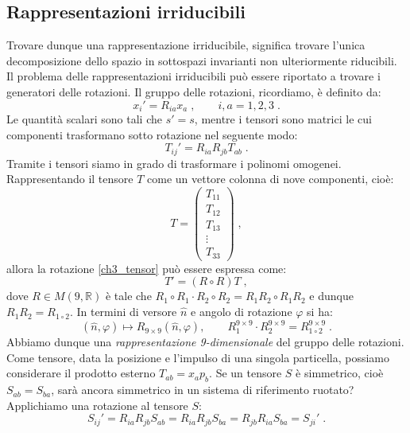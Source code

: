 \subsection{Rappresentazioni irriducibili}
Trovare dunque una rappresentazione irriducibile, significa trovare l'unica decomposizione dello spazio in sottospazi invarianti non 
ulteriormente riducibili. Il problema delle rappresentazioni irriducibili può essere riportato a trovare i generatori delle rotazioni.
Il gruppo delle rotazioni, ricordiamo, è definito da:
\begin{equation}
x_i'=R_{ia}x_a\;,\qquad i,a=1,2,3\;.
\end{equation}
Le quantità scalari sono tali che $s'=s$, mentre i tensori sono matrici le cui componenti trasformano sotto rotazione nel seguente modo:
\begin{equation}
T_{ij}'=R_{ia}R_{jb}T_{ab}\;. \label{ch3_tensor}
\end{equation}
Tramite i tensori siamo in grado di trasformare i polinomi omogenei. Rappresentando il tensore $T$ come un vettore colonna di nove 
componenti, cioè:
\begin{equation}
T=\begin{pmatrix}
T_{11} \\
T_{12} \\
T_{13} \\
\vdots \\
T_{33}
\end{pmatrix}\;,
\end{equation}
allora la rotazione \eqref{ch3_tensor} può essere espressa come:
\begin{equation}
T'=(R\circ R)T\;,
\end{equation}
dove $R\in M(9,\mathbb{R})$ è tale che $R_1\circ R_1\cdot R_2\circ R_2=R_1R_2\circ R_1R_2$ e dunque $R_1R_2=R_{1\circ 2}$. In termini 
di versore $\hat{n}$ e angolo di rotazione $\varphi$ si ha:
\begin{equation}
(\hat{n},\varphi)\longmapsto R_{9\times 9}(\hat{n},\varphi),\qquad R_1^{9\times 9}\cdot R_2^{9\times 9}=R_{1\circ 2}^{9\times 9}\;.
\end{equation}
Abbiamo dunque una \textit{rappresentazione 9-dimensionale} del gruppo delle rotazioni. Come tensore, data la posizione e l'impulso di 
una singola particella, possiamo considerare il prodotto esterno $T_{ab}=x_ap_b$. Se un tensore $S$ è simmetrico, cioè $S_{ab}=S_{ba}$, sarà ancora simmetrico in un sistema di riferimento ruotato? Applichiamo una rotazione al tensore $S$:
\begin{equation}
S_{ij}'=R_{ia}R_{jb}S_{ab}=R_{ia}R_{jb}S_{ba}=R_{jb}R_{ia}S_{ba}=S_{ji}'\;.
\end{equation}
